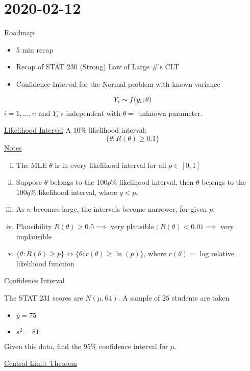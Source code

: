 \section{2020-02-12}
\underline{Roadmap}:
\begin{itemize}
    \item 5 min recap
    \item Recap of STAT 230
          \subitem (Strong) Law of Large \#'s
          \subitem CLT
    \item Confidence Interval for the Normal problem with known variance
\end{itemize}
\[ Y_i \thicksim f(y_i;\theta) \]
$ i=1,\ldots ,n $ and $ Y_i $'s independent with $ \theta= $ unknown parameter.

\underline{Likelihood Interval}
A $ 10\% $ likelihood interval:
\[ \{\theta:R(\theta)\geqslant 0.1\} \]
\underline{Notes}
\begin{enumerate}[(i)]
    \item The MLE $ \theta $ is in every likelihood interval for all $ p\in[0,1] $
    \item Suppose $ \theta $ belongs to the $ 100p\% $ likelihood interval, then
          $ \theta $ belongs to the $ 100q\% $ likelihood interval, where $ q<p $.
    \item As $ n $ becomes large, the intervals become narrower, for given $ p $.
    \item Plausibility
          \subitem $ R(\theta)\geqslant 0.5\implies $ very plausible
          \subitem $ \vdots $
          \subitem $ R(\theta)<0.01\implies $ very implausible
    \item $ \{\theta:R(\theta)\geqslant p\}\iff \{\theta:r(\theta)\geqslant \ln(p)\} $,
          where $ r(\theta) = $ log relative likelihood function
\end{enumerate}
\underline{Confidence Interval}
\begin{exbox}
    \begin{example}
        The STAT 231 scores are $ N(\mu,64) $. A sample of $ 25 $ students are
        taken
        \begin{itemize}
            \item $ \overline{y}=75 $
            \item $ s^2=81 $
        \end{itemize}
        Given this data, find the $ 95\% $ confidence interval for $ \mu $.
    \end{example}
\end{exbox}
\underline{Central Limit Theorem}


